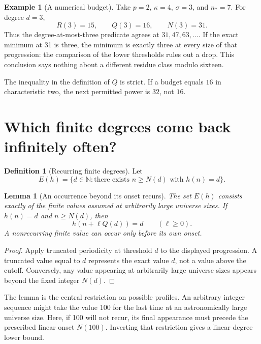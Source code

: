 \documentclass[11pt,a4paper,oneside,openany]{book}
\newtheorem{lemma}[theorem]{Lemma}
\theoremstyle{definition}\newtheorem{definition}[theorem]{Definition}
\newtheorem{example}[theorem]{Example}
\theoremstyle{remark}\newtheorem{remark}[theorem]{Remark}
\newcommand{\NN}{\mathbb N}\newcommand{\N}{\mathbb N}\newcommand{\Z}{\mathbb Z}\newcommand{\Q}{\mathbb Q}\newcommand{\Fp}{\mathbb F_p}
\numberwithin{equation}{chapter}
\begin{document}
\begin{example}[A numerical budget]\label{tx:eg:numerical-period}
Take $p=2$, $\kappa=4$, $\sigma=3$, and $n_*=7$. For degree $d=3$,
\[
                       R(3)=15,\qquad Q(3)=16,\qquad N(3)=31.
\]
Thus the degree-at-most-three predicate agrees at $31,47,63,\ldots$.
If the exact minimum at 31 is three, the minimum is exactly three at
every size of that progression: the comparison of the lower thresholds
rules out a drop. This conclusion says nothing about a different
residue class modulo sixteen.

The inequality in the definition of $Q$ is strict. If a budget equals
$16$ in characteristic two, the next permitted power is $32$, not $16$.
\end{example}

\section{Which finite degrees come back infinitely often?}
\begin{definition}[Recurring finite degrees]\label{tx:def:recurring}
Let
\[
 E(h)=\{d\in\NN:\text{there exists }n\ge N(d)\text{ with }h(n)=d\}.
\]
\end{definition}

\begin{lemma}[An occurrence beyond its onset recurs]\label{tx:lem:recurrence}
The set $E(h)$ consists exactly of the finite values assumed at
arbitrarily large universe sizes. If $h(n)=d$ and $n\ge N(d)$, then
\[
                          h(n+\ell Q(d))=d\qquad(\ell\ge0).
\]
A nonrecurring finite value can occur only before its own onset.
\end{lemma}
\begin{proof}
Apply truncated periodicity at threshold $d$ to the displayed
progression. A truncated value equal to $d$ represents the exact value
$d$, not a value above the cutoff. Conversely, any value appearing at
arbitrarily large universe sizes appears beyond the fixed integer $N(d)$.
\end{proof}

The lemma is the central restriction on possible profiles. An arbitrary
integer sequence might take the value 100 for the last time at an
astronomically large universe size. Here, if 100 will not recur, its final
appearance must precede the prescribed linear onset $N(100)$.
Inverting that restriction gives a linear degree lower bound.
\end{document}
